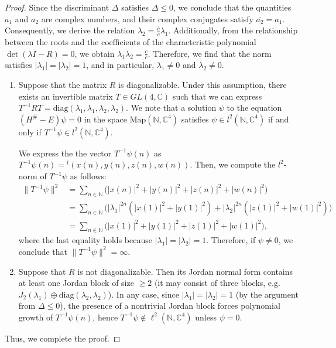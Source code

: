 \documentclass{amsart}
\theoremstyle{definition}
\theoremstyle{remark}
\begin{document}
\begin{proof}
Since the discriminant \(\Delta\) satisfies \(\Delta \leq 0\), we conclude that the quantities \(a_1\) and \(a_2\) are complex numbers, and their complex conjugates satisfy \(\overline{a_2} = a_1\). Consequently, we derive the relation \(\lambda_2 = \frac{\bar{c}}{c} \lambda_1\). Additionally, from the relationship between the roots and the coefficients of the characteristic polynomial \(\det(\lambda I - R) = 0\), we obtain \(\lambda_1 \lambda_2 = \frac{c}{\bar{c}}\). Therefore, we find that the norm satisfies \(|\lambda_1| = |\lambda_2| = 1\), and in particular, \(\lambda_1 \neq 0\) and \(\lambda_2 \neq 0\).

\begin{enumerate}
    \item Suppose that the matrix \(R\) is diagonalizable. Under this assumption, there exists an invertible matrix \(T \in GL(4, \mathbb{C})\) such that we can express \(T^{-1} R T = \text{diag}(\lambda_1, \lambda_1, \lambda_2, \lambda_2)\). We note that a solution \(\psi\) to the equation \((H^\# - E)\psi = 0\) in the space \(\text{Map}(\mathbb{N}, \mathbb{C}^4)\) satisfies \(\psi \in l^2(\mathbb{N}, \mathbb{C}^4)\) if and only if \(T^{-1} \psi \in l^2(\mathbb{N}, \mathbb{C}^4)\).

    We express the the vector $T^{-1} \psi(n)$ as \(T^{-1} \psi(n) = {}^t (x(n), y(n), z(n), w(n))\). Then, we compute the \(l^2\)-norm of \(T^{-1} \psi\) as follows:
    \begin{align*}
    \| T^{-1} \psi \|^{2} &= \sum_{n \in \mathbb{N}} \big( |x(n)|^2 + |y(n)|^2 + |z(n)|^2 + |w(n)|^2 \big) \\
    &= \sum_{n \in \mathbb{N}} \big( |\lambda_1|^{2n} (|x(1)|^2 + |y(1)|^2) + |\lambda_2|^{2n} (|z(1)|^2 + |w(1)|^2) \big) \\
    &= \sum_{n \in \mathbb{N}} \big( |x(1)|^2 + |y(1)|^2 + |z(1)|^2 + |w(1)|^2 \big),
    \end{align*}
    where the last equality holds because \(|\lambda_1| = |\lambda_2| = 1\). Therefore, if \(\psi \neq 0\), we conclude that \(\| T^{-1} \psi \|^2 = \infty\).

    \item Suppose that $R$ is not diagonalizable. Then its Jordan normal form contains at least one Jordan block
of size $\ge 2$ (it may consist of three blocks, e.g.\ $J_2(\lambda_1)\oplus \mathrm{diag}(\lambda_2,\lambda_2)$).
In any case, since $|\lambda_1|=|\lambda_2|=1$ (by the argument from $\Delta\le 0$), the presence of a
nontrivial Jordan block forces polynomial growth of $T^{-1}\psi(n)$, hence $T^{-1}\psi\notin \ell^2(\mathbb{N},\mathbb{C}^4)$
unless $\psi=0$.
\end{enumerate}

Thus, we complete the proof.
\end{proof}
\end{document}

